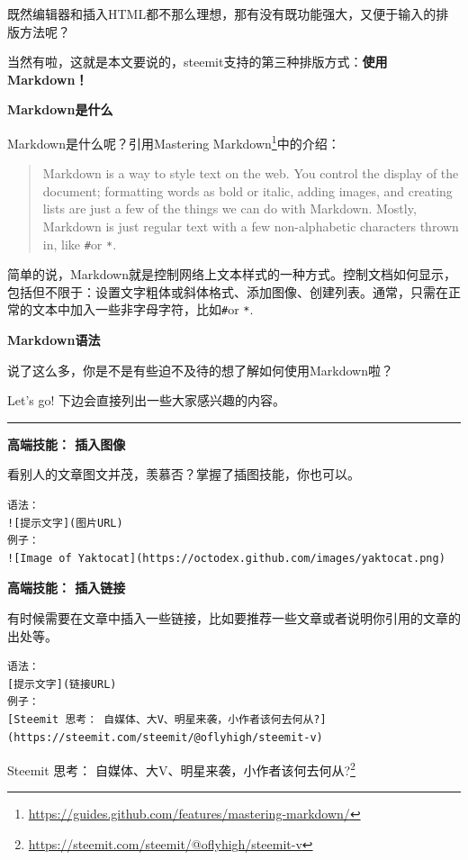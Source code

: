 \documentclass[]{ctexbook}
\renewcommand{\href}[2]{#2\footnote{\url{#1}}}
\begin{document}
既然编辑器和插入HTML都不那么理想，那有没有既功能强大，又便于输入的排版方法呢？

当然有啦，这就是本文要说的，steemit支持的第三种排版方式：\textbf{使用Markdown！}

\textbf{Markdown是什么}

Markdown是什么呢？引用\href{https://guides.github.com/features/mastering-markdown/}{Mastering Markdown}中的介绍：

\begin{quote}
Markdown is a way to style text on the web. You control the display of the document; formatting words as bold or italic, adding images, and creating lists are just a few of the things we can do with Markdown. Mostly, Markdown is just regular text with a few non-alphabetic characters thrown in, like \texttt{\#}or \texttt{*}.
\end{quote}

简单的说，Markdown就是控制网络上文本样式的一种方式。控制文档如何显示，包括但不限于：设置文字粗体或斜体格式、添加图像、创建列表。通常，只需在正常的文本中加入一些非字母字符，比如\texttt{\#}or \texttt{*}.

\textbf{Markdown语法}

说了这么多，你是不是有些迫不及待的想了解如何使用Markdown啦？

Let's go! 下边会直接列出一些大家感兴趣的内容。

\begin{center}\rule{0.5\linewidth}{\linethickness}\end{center}

\textbf{高端技能： 插入图像}

看别人的文章图文并茂，羡慕否？掌握了插图技能，你也可以。

\begin{verbatim}
语法：
![提示文字](图片URL)
例子：
![Image of Yaktocat](https://octodex.github.com/images/yaktocat.png)
\end{verbatim}

\textbf{高端技能： 插入链接}

有时候需要在文章中插入一些链接，比如要推荐一些文章或者说明你引用的文章的出处等。

\begin{verbatim}
语法：
[提示文字](链接URL)
例子：
[Steemit 思考： 自媒体、大V、明星来袭，小作者该何去何从?](https://steemit.com/steemit/@oflyhigh/steemit-v)
\end{verbatim}

\href{https://steemit.com/steemit/@oflyhigh/steemit-v}{Steemit 思考： 自媒体、大V、明星来袭，小作者该何去何从?}
\end{document}
